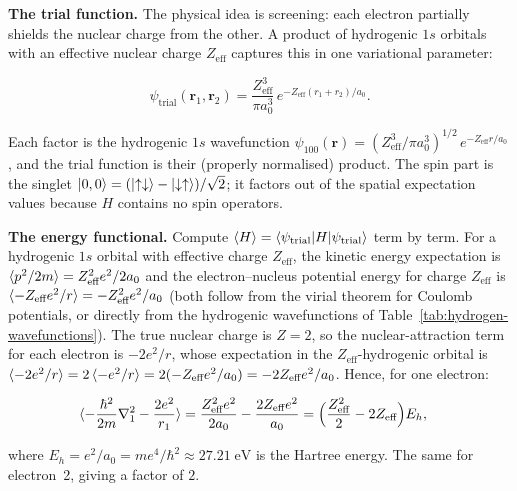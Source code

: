 \medskip\noindent\textbf{The trial function.}
The physical idea is screening: each electron partially shields the nuclear charge from the other. A product of hydrogenic $1s$ orbitals with an effective nuclear charge $Z_{\text{eff}}$ captures this in one variational parameter:
\begin{linenomath}
\begin{equation}
\psi_{\text{trial}}(\bm r_{1},\bm r_{2}) = \frac{Z_{\text{eff}}^{3}}{\pi a_{0}^{3}}\,
e^{-Z_{\text{eff}}(r_{1}+r_{2})/a_{0}}.
\label{eq:helium-trial}
\end{equation}
\end{linenomath}
Each factor is the hydrogenic $1s$ wavefunction $\psi_{100}(\bm r) = (Z_{\text{eff}}^{3}/\pi a_{0}^{3})^{1/2}\,e^{-Z_{\text{eff}}r/a_{0}}$, and the trial function is their (properly normalised) product. The spin part is the singlet $\ket{0,0}=(\ket{\uparrow\downarrow}-\ket{\downarrow\uparrow})/\sqrt{2}$; it factors out of the spatial expectation values because $H$ contains no spin operators.

\medskip\noindent\textbf{The energy functional.}
Compute $\braket{H} = \braket{\psi_{\text{trial}}|H|\psi_{\text{trial}}}$ term by term.
For a hydrogenic $1s$ orbital with effective charge $Z_{\text{eff}}$, the kinetic energy expectation is $\braket{p^{2}/2m} = Z_{\text{eff}}^{2}e^{2}/2a_{0}$ and the electron--nucleus potential energy for charge $Z_{\text{eff}}$ is $\braket{-Z_{\text{eff}}e^{2}/r} = -Z_{\text{eff}}^{2}e^{2}/a_{0}$ (both follow from the virial theorem for Coulomb potentials, or directly from the hydrogenic wavefunctions of Table~\ref{tab:hydrogen-wavefunctions}). The true nuclear charge is $Z=2$, so the nuclear-attraction term for each electron is $-2e^{2}/r$, whose expectation in the $Z_{\text{eff}}$-hydrogenic orbital is $\braket{-2e^{2}/r} = 2\braket{-e^{2}/r} = 2(-Z_{\text{eff}}e^{2}/a_{0}) = -2Z_{\text{eff}}e^{2}/a_{0}$. Hence, for one electron:
\begin{linenomath}
\begin{align*}
\braket{-\frac{\hbar^{2}}{2m}\nabla_{1}^{2} - \frac{2e^{2}}{r_{1}}}
&= \frac{Z_{\text{eff}}^{2}e^{2}}{2a_{0}} - \frac{2Z_{\text{eff}}e^{2}}{a_{0}}
   = \Bigl(\frac{Z_{\text{eff}}^{2}}{2} - 2Z_{\text{eff}}\Bigr)E_{h},
\end{align*}
\end{linenomath}
where $E_{h} = e^{2}/a_{0} = me^{4}/\hbar^{2} \approx 27.21\;\text{eV}$ is the Hartree energy. The same for electron~2, giving a factor of $2$.

